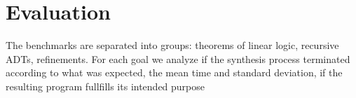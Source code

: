\documentclass{llncs}
\newcommand{\lolli}{\multimap}
\newcommand{\tensor}{\otimes}
\newcommand{\bang}{{!}}
\newcommand{\mypara}[1]{\paragraph{\textbf{#1}.}}
\begin{document}







\section{Evaluation}\label{sec:evaluation}

The benchmarks are separated into groups: theorems of linear logic, recursive
ADTs, refinements. For each goal we analyze if the synthesis process terminated
according to what was expected, the mean time and standard deviation, if the
resulting program fullfills its intended purpose
\end{document}

